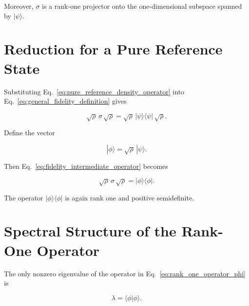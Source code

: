 Moreover, \( \sigma \) is a rank-one projector onto the one-dimensional subspace spanned by \( |\psi\rangle \).


\section*{Reduction for a Pure Reference State}

Substituting Eq.~\eqref{eq:pure_reference_density_operator} into Eq.~\eqref{eq:general_fidelity_definition} gives

\begin{equation}
\sqrt{\rho}\,
\sigma\,
\sqrt{\rho}
=
\sqrt{\rho}\,
|\psi\rangle\langle\psi|\,
\sqrt{\rho}.
\label{eq:fidelity_intermediate_operator}
\end{equation}

Define the vector

\begin{equation}
|\phi\rangle
=
\sqrt{\rho}\,
|\psi\rangle.
\label{eq:phi_definition}
\end{equation}

Then Eq.~\eqref{eq:fidelity_intermediate_operator} becomes

\begin{equation}
\sqrt{\rho}\,
\sigma\,
\sqrt{\rho}
=
|\phi\rangle\langle\phi|.
\label{eq:rank_one_operator_phi}
\end{equation}

The operator \( |\phi\rangle\langle\phi| \) is again rank one and positive semidefinite.


\section*{Spectral Structure of the Rank-One Operator}

The only nonzero eigenvalue of the operator in Eq.~\eqref{eq:rank_one_operator_phi} is

\begin{equation}
\lambda
=
\langle \phi | \phi \rangle.
\label{eq:rank_one_eigenvalue}
\end{equation}

